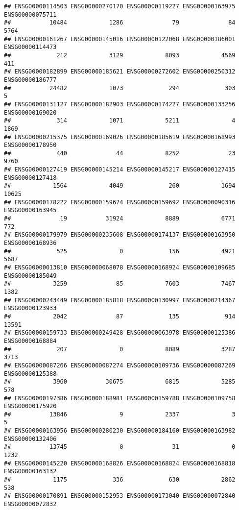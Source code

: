 \documentclass[
]{article}
\begin{document}
\begin{verbatim}
## ENSG00000114503 ENSG00000270170 ENSG00000119227 ENSG00000163975 ENSG00000075711 
##           10484            1286              79              84            5764 
## ENSG00000161267 ENSG00000145016 ENSG00000122068 ENSG00000186001 ENSG00000114473 
##             212            3129            8093            4569             411 
## ENSG00000182899 ENSG00000185621 ENSG00000272602 ENSG00000250312 ENSG00000186777 
##           24482            1073             294             303               5 
## ENSG00000131127 ENSG00000182903 ENSG00000174227 ENSG00000133256 ENSG00000169020 
##             314            1071            5211               4            1869 
## ENSG00000215375 ENSG00000169026 ENSG00000185619 ENSG00000168993 ENSG00000178950 
##             440              44            8252              23            9760 
## ENSG00000127419 ENSG00000145214 ENSG00000145217 ENSG00000127415 ENSG00000127418 
##            1564            4049             260            1694           10625 
## ENSG00000178222 ENSG00000159674 ENSG00000159692 ENSG00000090316 ENSG00000163945 
##              19           31924            8889            6771             772 
## ENSG00000179979 ENSG00000235608 ENSG00000174137 ENSG00000163950 ENSG00000168936 
##             525               0             156            4921            5687 
## ENSG00000013810 ENSG00000068078 ENSG00000168924 ENSG00000109685 ENSG00000185049 
##            3259              85            7603            7467            1382 
## ENSG00000243449 ENSG00000185818 ENSG00000130997 ENSG00000214367 ENSG00000123933 
##            2042              87             135             914           13591 
## ENSG00000159733 ENSG00000249428 ENSG00000063978 ENSG00000125386 ENSG00000168884 
##             207               0            8089            3287            3713 
## ENSG00000087266 ENSG00000087274 ENSG00000109736 ENSG00000087269 ENSG00000125388 
##            3960           30675            6815            5285             578 
## ENSG00000197386 ENSG00000188981 ENSG00000159788 ENSG00000109758 ENSG00000175920 
##           13846               9            2337               3               5 
## ENSG00000163956 ENSG00000280230 ENSG00000184160 ENSG00000163982 ENSG00000132406 
##           13745               0              31               0            1232 
## ENSG00000145220 ENSG00000168826 ENSG00000168824 ENSG00000168818 ENSG00000163132 
##            1175             336             630            2862             538 
## ENSG00000170891 ENSG00000152953 ENSG00000173040 ENSG00000072840 ENSG00000072832 

\end{verbatim}
\end{document}
